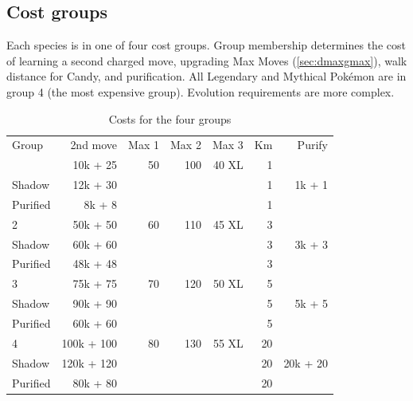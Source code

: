 \subsection{Cost groups\label{subsec:costgroups}}
Each species is in one of four cost groups.
Group membership determines the cost of
  learning a second charged move,
  upgrading Max Moves (\autoref{sec:dmaxgmax}),
  walk distance for Candy,
  and purification.
All Legendary and Mythical Pokémon are in group 4 (the most expensive group).
Evolution requirements are more complex.
\begin{table}
\centering
\footnotesize
\begin{tabular}{lrrrrrr}
  Group & 2nd move   & Max 1 & Max 2 & Max 3 & Km & Purify\\
\Midrule
      1 & 10k + 25   & 50    & 100   & 40 XL & 1  &       \\
  Shadow& 12k + 30   &       &       &       & 1  & 1k + 1\\
Purified& 8k + 8   &       &       &       & 1  &         \\
      2 & 50k + 50   & 60    & 110   & 45 XL & 3  &       \\
  Shadow& 60k + 60   &       &       &       & 3  & 3k + 3\\
  Purified& 48k + 48   &       &       &       & 3  &     \\
      3 & 75k + 75   & 70    & 120   & 50 XL & 5  &       \\
  Shadow& 90k + 90   &       &       &       & 5  & 5k + 5\\
  Purified & 60k + 60 &   &    &   & 5 &                  \\
      4 & 100k + 100 & 80    & 130   & 55 XL & 20 &       \\
  Shadow& 120k + 120 &       &       &       & 20 & 20k + 20\\
Purified& 80k + 80 &   &    &   & 20 & \\
\end{tabular}
  \caption{Costs for the four groups\label{table:costs}}
\end{table}

